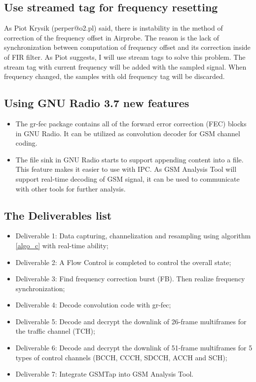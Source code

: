\documentclass[a4paper,12pt,oneside]{article}
\begin{document}
\subsection{Use streamed tag for frequency resetting}

As Piot Krysik (perper@o2.pl) said, there is instability in the method of correction of the frequency offset in Airprobe. 
The reason is the lack of synchronization between computation of frequency offset and its correction inside of FIR filter. 
As Piot suggests, I will use stream tags to solve this problem. The stream tag with current frequency will be added with the sampled signal.
When frequency changed, the samples with old frequency tag will be discarded. 

\subsection{Using GNU Radio 3.7 new features}
\begin{itemize}
\item The gr-fec \cite{grfec} package contains all of the forward error correction (FEC) blocks in GNU Radio. It can be utilized as convolution
decoder for GSM channel coding.

\item The file sink in GNU Radio starts to support appending content into a file. This feature makes it easier to use with IPC.
As GSM Analysis Tool will support real-time decoding of GSM signal, it can be used to communicate with other tools for
further analysis.
\end{itemize}

\subsection{The Deliverables list}
\begin{itemize}
\item Deliverable 1: Data capturing, channelization and resampling using algorithm \ref{algo_c} with real-time ability;
\item Deliverable 2: A Flow Control is completed to control the overall state;
\item Deliverable 3: Find frequency correction burst (FB). Then realize frequency synchronization;
\item Deliverable 4: Decode convolution code with gr-fec;
\item Deliverable 5: Decode and decrypt the downlink of 26-frame multiframes for the traffic channel (TCH);
\item Deliverable 6: Decode and decrypt the downlink of 51-frame multiframes for 5 types of control channels (BCCH, CCCH, SDCCH, ACCH and SCH);
\item Deliverable 7: Integrate GSMTap into GSM Analysis Tool.
\end{itemize}
\end{document}
